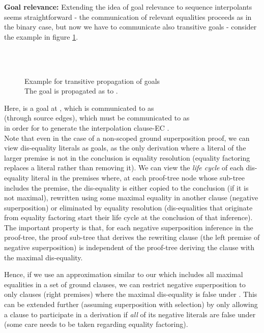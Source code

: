 \textbf{Goal relevance:}
Extending the idea of goal relevance to sequence interpolants seems straightforward - the communication of relevant equalities proceeds as in the binary case, but now we have to communicate also transitive goals - consider the  example in figure \ref{example_4.2.2.3}.

\begin{figure}
\\
\\
\caption{Example for transitive propagation of goals\\
The goal  is propagated as  to .}
\label{example_4.2.2.3}
\end{figure}

\noindent
Here,  is a goal at , which is communicated to  as \\
 (through source edges), 
which must be communicated to  as\\  in order for  to generate the interpolation clause-EC .\\
Note that even in the case of a non-scoped ground superposition proof, we can view dis-equality literals as goals, 
as the only derivation where a literal of the larger premise is not in the conclusion is equality resolution (equality factoring replaces a literal rather than removing it). We can view the \emph{life cycle} of each dis-equality literal in the premises where, at each proof-tree node whose sub-tree includes the premise, the dis-equality is either copied to the conclusion (if it is not maximal), rewritten using some maximal equality in another clause (negative superposition) or eliminated by equality resolution (dis-equalities that originate from equality factoring start their life cycle at the conclusion of that inference). \\
The important property is that, for each negative superposition inference in the proof-tree, the proof sub-tree that derives the rewriting clause (the left premise of negative superposition) is independent of the proof-tree deriving the clause with the maximal dis-equality.

Hence, if we use an approximation similar to our  which includes all maximal equalities in a set of ground clauses, 
we can restrict negative superposition to only clauses (right premises) where the maximal dis-equality is false under . 
This can be extended further (assuming superposition with selection) by only allowing a clause to participate in a derivation if \emph{all} of its negative literals are false under  (some care needs to be taken regarding equality factoring).

